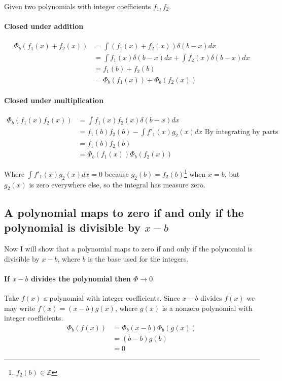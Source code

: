 \documentclass[12pt]{article}
\begin{document}
Given two polynomials with integer coefficients $f_1, f_2$.
\paragraph*{Closed under addition}
\begin{align*}
\Phi_b(f_1(x)+f_2(x)) &= \int (f_1(x) + f_2(x)) \delta(b-x) dx \\
&= \int f_1(x) \delta(b-x) dx + \int f_2(x) \delta(b-x) dx \\
&= f_1(b) + f_2(b)\\
&= \Phi_b(f_1(x)) + \Phi_b(f_2(x))
\end{align*}

\paragraph{Closed under multiplication}
\begin{align*}
\Phi_b(f_1(x) f_2(x)) &= \int f_1(x) f_2(x) \delta(b-x) dx \\
&= f_1(b) f_2(b) - \int f'_1(x) g_2(x)dx \text{ By integrating by parts }\\
&= f_1(b) f_2(b)\\
&= \Phi_b(f_1(x)) \Phi_b(f_2(x))
\end{align*}

Where $\int f'_1(x) g_2(x) dx = 0$ because $g_2(b) = f_2(b)$\footnote{$f_2(b) \in \mathbb{Z}$} when $x=b$, but $g_2(x)$ is zero everywhere else, so the integral has measure zero.


\subsection*{A polynomial maps to zero if and only if the polynomial is divisible by $x-b$}
Now I will show that a polynomial maps to zero if and only if the polynomial is divisible by $x-b$, where $b$ is the base used for the integers.  
\paragraph*{If $x-b$ divides the polynomial then $\Phi \rightarrow 0$}
Take $f(x)$  a polynomial with integer coefficients.  Since $x-b$ divides $f(x)$ we may write $f(x) = (x-b)g(x)$, where $g(x)$ is a nonzero polynomial with integer coefficients.
\begin{align*}
\Phi_b(f(x)) &= \Phi_b(x-b) \Phi_b(g(x)) \\
&= (b-b) g(b) \\
&= 0 
\end{align*}
\end{document}
